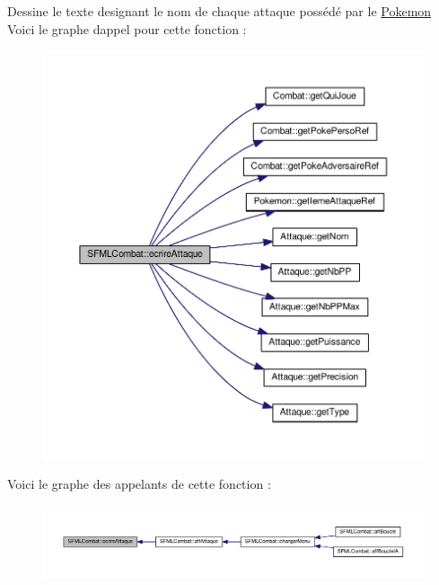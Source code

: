 Dessine le texte designant le nom de chaque attaque possédé par le \hyperlink{class_pokemon}{Pokemon} Voici le graphe d\textquotesingle{}appel pour cette fonction \+:\nopagebreak
\begin{figure}[H]
\begin{center}
\leavevmode
\includegraphics[width=350pt]{class_s_f_m_l_combat_a83899ae7d061225976857060d2a16388_cgraph}
\end{center}
\end{figure}
Voici le graphe des appelants de cette fonction \+:\nopagebreak
\begin{figure}[H]
\begin{center}
\leavevmode
\includegraphics[width=350pt]{class_s_f_m_l_combat_a83899ae7d061225976857060d2a16388_icgraph}
\end{center}
\end{figure}
\mbox{\label{class_s_f_m_l_combat_a557bb97c785650b8d28ff913ca86081a}} 
